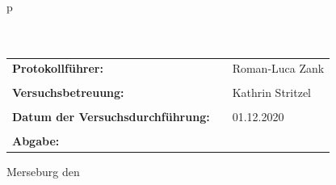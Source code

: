 \begin{center}
\begin{tabular}{p{\textwidth}}
\\ \\ \\

\begin{center}
\begin{tabular}{lll}
\large{\textbf{Protokollführer:}} & & \large{Roman-Luca Zank}\\
&&\\
\large{\textbf{Versuchsbetreuung:}} & & \large{Kathrin Stritzel}\\
&&\\
\large{\textbf{Datum der Versuchsdurchführung:}}&& \large{01.12.2020}\\
&&\\
\large{\textbf{Abgabe:}}&& \large{\todayDE}
\end{tabular}
\end{center}

\end{tabular}

\end{center}
\vfill

\large{Merseburg den \todayDE}

